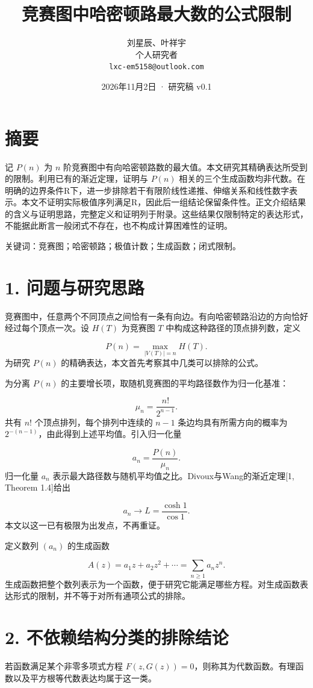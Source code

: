 \documentclass[12pt,a4paper]{article}
\title{竞赛图中哈密顿路最大数的公式限制}
\author{刘星辰、叶祥宇\\ 个人研究者\\ \texttt{lxc-em5158@outlook.com}}
\date{2026年11月2日 · 研究稿 v0.1}
\begin{document}
\maketitle
\section*{摘要}
记 $P(n)$ 为 $n$ 阶竞赛图中有向哈密顿路数的最大值。本文研究其精确表达所受到的限制。利用已有的渐近定理，证明与 $P(n)$ 相关的三个生成函数均非代数。在明确的边界条件R下，进一步排除若干有限阶线性递推、伸缩关系和线性数字表示。本文不证明实际极值序列满足R，因此后一组结论保留条件性。正文介绍结果的含义与证明思路，完整定义和证明列于附录。这些结果仅限制特定的表达形式，不能据此断言一般闭式不存在，也不构成计算困难性的证明。

关键词：竞赛图；哈密顿路；极值计数；生成函数；闭式限制。

\section*{1. 问题与研究思路}
竞赛图中，任意两个不同顶点之间恰有一条有向边。有向哈密顿路沿边的方向恰好经过每个顶点一次。设 $H(T)$ 为竞赛图 $T$ 中构成这种路径的顶点排列数，定义

\[
P(n)=\max_{|V(T)|=n}H(T).
\]
为研究 $P(n)$ 的精确表达，本文首先考察其中几类可以排除的公式。

为分离 $P(n)$ 的主要增长项，取随机竞赛图的平均路径数作为归一化基准：

\[
\mu_n=\frac{n!}{2^{n-1}}.
\]
共有 $n!$ 个顶点排列，每个排列中连续的 $n-1$ 条边均具有所需方向的概率为 $2^{-(n-1)}$，由此得到上述平均值。引入归一化量

\[
a_n=\frac{P(n)}{\mu_n}.
\]
归一化量 $a_n$ 表示最大路径数与随机平均值之比。Divoux与Wang的渐近定理[1, Theorem 1.4]给出

\[
a_n\longrightarrow L=\frac{\cosh1}{\cos1}.
\]
本文以这一已有极限为出发点，不再重证。

定义数列 $(a_n)$ 的生成函数

\[
A(z)=a_1z+a_2z^2+\cdots=\sum_{n\ge1}a_nz^n.
\]
生成函数把整个数列表示为一个函数，便于研究它能满足哪些方程。对生成函数表达形式的限制，并不等于对所有通项公式的排除。

\section*{2. 不依赖结构分类的排除结论}
若函数满足某个非零多项式方程 $F(z,G(z))=0$，则称其为代数函数。有理函数以及平方根等代数表达均属于这一类。
\end{document}
